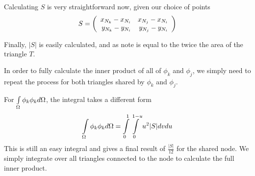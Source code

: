 Calculating $S$ is very straightforward now, given our choice of points
\begin{equation}
S = \left(\begin{array}{rrrrrr} 
    x_{N_k} - x_{N_i} & x_{N_j} - x_{N_i} \\ 
    y_{N_k} - y_{N_i} & y_{N_j} - y_{N_i}
 \\ \end{array} \right)
\end{equation}

Finally, $|S|$ is easily calculated, and as note is equal to the twice the area of
the triangle $T$.

In order to fully calculate the inner product of all of $\phi_k$ and $\phi_j$, we simply need to repeat the process
for both triangles shared by $\phi_k$ and $\phi_j$.

For $\int\limits_{\Omega} \phi_k \phi_k d\Omega$, the integral takes a different form
\begin{equation}
\int\limits_{\Omega} \phi_k \phi_k d\Omega = \int\limits_0^1 \int\limits_0^{1-u} u^2 |S| dv du
\end{equation}
This is still an easy integral and gives a final result of $\frac{|S|}{12}$ for the shared node. We simply integrate
over all triangles connected to the node to calculate the full inner product.
